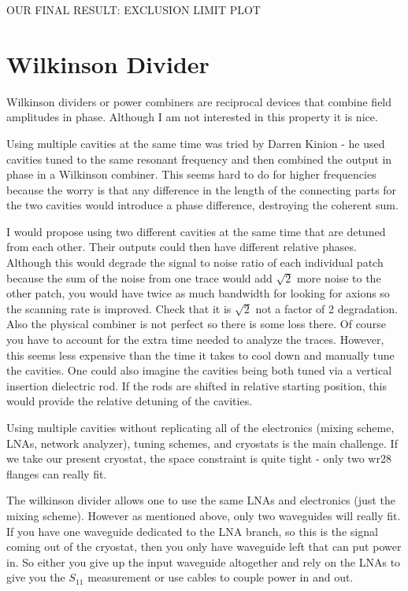 \documentclass[11pt]{article}
\begin{document}
OUR FINAL RESULT: EXCLUSION LIMIT PLOT

\section{Wilkinson Divider}

Wilkinson dividers or  power combiners are reciprocal devices that combine field amplitudes in phase. Although I am not interested in this property it is nice.

Using multiple cavities at the same time was tried by Darren Kinion - he used cavities tuned to the same resonant frequency and then combined the output in phase in a Wilkinson combiner. This seems hard to do for higher frequencies because the worry is that any difference in the length of the connecting parts for the two cavities would introduce a phase difference, destroying the coherent sum. 

I would propose using two different cavities at the same time that are detuned from each other. Their outputs could then have different relative phases. Although this would degrade the signal to noise ratio of each individual patch because the sum of the noise from one trace would add $\sqrt{2}$ more noise to the other patch, you would have twice as much bandwidth for looking for axions so the scanning rate is improved. Check that it is $\sqrt{2}$ not a factor of 2 degradation. Also the physical combiner is not perfect so there is some loss there. Of course you have to account for the extra time needed to analyze the traces. However, this seems less expensive than the time it takes to cool down and manually tune the cavities. One could also imagine the cavities being both tuned via a vertical insertion dielectric rod. If the rods are shifted in relative starting position, this would provide the relative detuning of the cavities.

Using multiple cavities without replicating all of the electronics (mixing scheme, LNAs, network analyzer), tuning schemes, and cryostats is the main challenge. If we take our present cryostat, the space constraint is quite tight - only two wr28 flanges can really fit.

The wilkinson divider allows one to use the same LNAs and electronics (just the mixing scheme). However as mentioned above, only two waveguides will really fit. If you have one waveguide dedicated to the LNA branch, so this is the signal coming out of the cryostat, then you only have waveguide left that can put power in. So either you give up the input waveguide altogether and rely on the LNAs to give you the $S_{11}$ measurement or use cables to couple power in and out.
\end{document}
